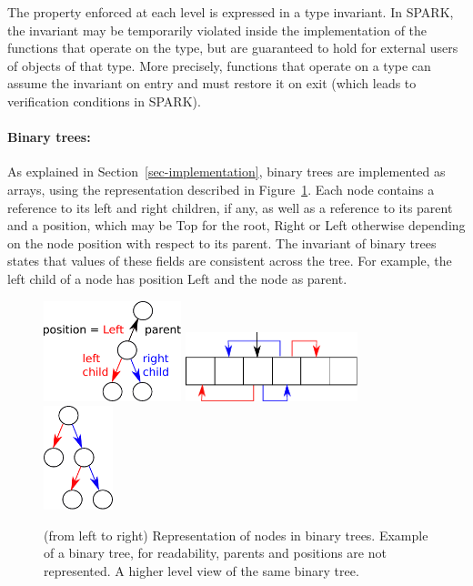 \documentclass{llncs}
\begin{document}
The property enforced at each level is expressed in a type invariant. In SPARK,
the invariant may be temporarily violated inside the implementation of the
functions that operate on the type, but are guaranteed to hold for external
users of objects of that type. More precisely, functions that operate
on a type can assume the invariant on entry and must restore it on exit (which
leads to verification conditions in SPARK).

\paragraph{Binary trees:}
As explained in Section~\ref{sec-implementation}, binary trees are
implemented as arrays, using the representation described in Figure~\ref{fig-binary}.
Each node contains a reference to its left and right children, if any, as well
as a reference to its parent and a position, which may be Top for the root,
Right or Left otherwise depending on the node position with respect to its
parent. The invariant of binary trees states that values of these fields are
consistent across the tree. For example, the left child of a node has position
Left and the node as parent.

\begin{figure}[ht]
\begin{center}
\includegraphics[width=4cm]{tree_structure.pdf}\hfill
\includegraphics[width=5cm]{binary_1.pdf}\hfill
\includegraphics[width=2cm]{binary_2.pdf}
\caption{(from left to right) Representation of nodes in binary trees.
Example of a binary tree, for readability, parents and positions are not represented.
A higher level view of the same binary tree.}
\label{fig-binary}
\end{center}
\end{figure}
\end{document}
